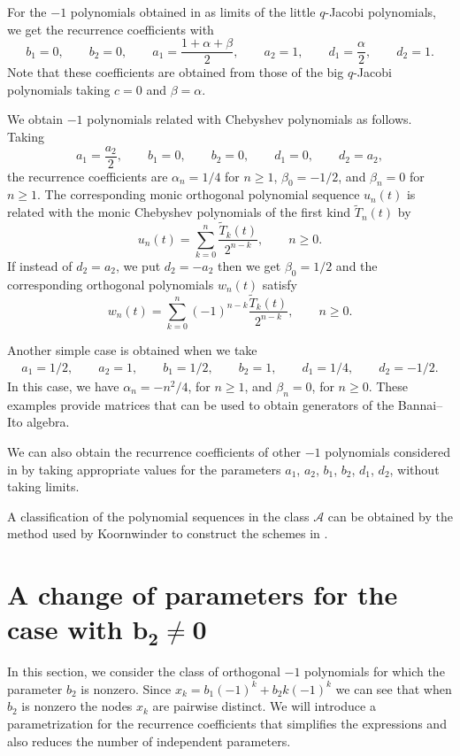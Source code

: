\documentclass[10pt,a4paper]{amsart}
\def\cA{\mathcal A}
\numberwithin{equation}{section}
\begin{document}
For the $-1$ polynomials obtained in \cite{VZ1} as limits of the little $q$-Jacobi polynomials, we get the recurrence coefficients with
\[
b_1=0,\qquad b_2=0,\qquad a_1=\dfrac{1+\alpha + \beta}{2},\qquad a_2=1,\qquad d_1=\dfrac{\alpha}{2},\qquad d_2=1.
\]
Note that these coefficients are obtained from those of the big $q$-Jacobi polynomials taking $c=0$ and $\beta=\alpha$.


We obtain $-1$ polynomials related with Chebyshev polynomials as follows. Taking
\[
a_1=\dfrac{a_2}{2},\qquad b_1=0,\qquad b_2=0,\qquad d_1=0, \qquad d_2=a_2,
\]
the recurrence coefficients are $\alpha_n=1/4$ for $n\ge 1$, $\beta_0=-1/2$, and $\beta_n=0$ for $n\ge 1$. The corresponding monic orthogonal polynomial sequence $u_n(t)$ is related with the monic Chebyshev polynomials of the first kind $\tilde T_n(t)$ by
\[
u_n(t)= \sum_{k=0}^n \dfrac{\tilde T_k(t)}{2^{n-k}}, \qquad n \ge 0.
\]
If instead of $d_2= a_2$, we put $d_2=- a_2$ then we get $\beta_0=1/2$ and the corresponding orthogonal polynomials $w_n(t)$ satisfy
\[
w_n(t)=\sum_{k=0}^n (-1)^{n-k} \dfrac{\tilde T_k(t)}{2^{n-k}}, \qquad n \ge 0.
\]

Another simple case is obtained when we take
\begin{gather*}
 a_1=1/2,\qquad a_2=1,\qquad b_1=1/2,\qquad b_2=1,\qquad d_1=1/4,\qquad d_2=-1/2.
 \end{gather*}
In this case, we have $\alpha_n=-n^2/4$, for $ n\ge 1$, and $\beta_n=0$, for $n\ge 0$. These examples provide matrices that can be used to obtain generators of the Bannai--Ito algebra.

We can also obtain the recurrence coefficients of other $-1$ polynomials considered in \cite{PellVZ} by taking appropriate values for the parameters $a_1$, $a_2$, $b_1$, $b_2$, $d_1$, $d_2$, without taking limits.

A classification of the polynomial sequences in the class $\cA$ can be obtained by the method used by Koornwinder to construct the schemes in \cite{KAsk, K2,K3}.


\section[A change of parameters for the case with b\_2 ne 0]{A change of parameters for the case with $\boldsymbol{b_2 \ne 0}$}\label{section4}
In this section, we consider the class of orthogonal $-1$ polynomials for which the parameter $b_2$ is nonzero. Since $x_k=b_1 (-1)^k + b_2 k (-1)^k$ we can see that when $b_2$ is nonzero the nodes $x_k$ are pairwise distinct.
 We will introduce a parametrization for the recurrence coefficients that simplifies the expressions and also reduces the number of independent parameters.
\end{document}
